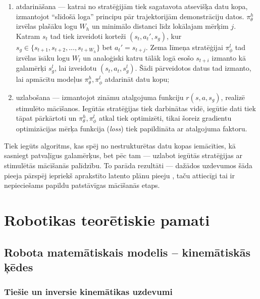 \documentclass[12pt, a4paper]{article}
\numberwithin{equation}{section} %
\begin{document}
\begin{enumerate}
    \item atdarināšana --- katrai no stratēģijām tiek sagatavota atsevišķa datu kopa, izmantojot ``slīdošā loga'' principu pār trajektorijām demonstrāciju datos. $\pi_{\theta}^h$ izvēlas plašāku logu $W_h$ un minimālo distanci līdz lokālajam mērķim $j$. Katram $s_t $ tad tiek izveidoti korteži $(s_t, a_t', s_g)$, kur $s_g \in \lbrace s_{t+1}, s_{t+2}, ..., s_{t+W_h} \rbrace$ bet $a_t' = s_{t+j}$. Zema līmeņa stratēģijai $\pi_{\phi}^l$ tad izvēlas īsāku logu $W_l$ un analoģiski katru tālāk logā esošo $s_{t+i}$ izmanto kā galamērķi $s_g^l$, lai izveidotu $(s_t, a_t, s_g^l)$. Šādi pārveidotos datus tad izmanto, lai apmācītu modeļus $\pi_{\theta}^h, \pi_{\phi}^l$ atdarināt datu kopu;
    \item uzlabošana --- izmantojot zināmu atalgojuma funkciju $r(s,a,s_g)$, realizē stimulēto mācīšanos. Iegūtās stratēģijas tiek darbinātas vidē, iegūtie dati tiek tāpat pārkārtoti un $\pi_{\theta}^h, \pi_{\phi}^l$ atkal tiek optimizēti, tikai šoreiz gradientu optimizācijas mērķa funkcija (\textit{loss}) tiek papildināta ar atalgojuma faktoru.
\end{enumerate}

Tiek iegūts algoritms, kas spēj no nestrukturētas datu kopas iemācīties, kā sasniegt patvaļīgus galamērķus, bet pēc tam --- uzlabot iegūtās stratēģijas ar stimulētās mācīšanās palīdzību. To parāda rezultāti --- dažādos uzdevumos šāda pieeja pārspēj iepriekš aprakstīto latento plānu pieeju \cite{lynch2020learning}, taču attiecīgi tai ir nepieciešams papildu patstāvīgas mācīšanās etaps.


%
%
%
%
%
%
%
%
%
%
%
%
%
%
%
%
%
%
%

\newpage
\section{Robotikas teorētiskie pamati}

\subsection{Robota matemātiskais modelis -- kinemātiskās ķēdes}

\subsubsection{Tiešie un inversie kinemātikas uzdevumi}
\end{document}
